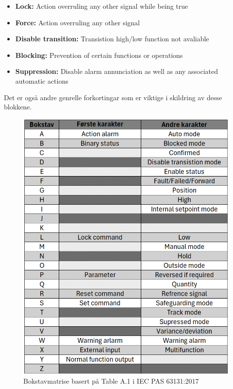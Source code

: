 \begin{itemize}
    \item \textbf{Lock:} Action overruling any other signal while being true
    \item \textbf{Force:} Action overruling any other signal                        
    \item \textbf{Disable transition:} Transistion high/low function not avaliable  
    \item \textbf{Blocking:} Prevention of certain functions or operations          
    \item \textbf{Suppression:} Disable alarm annunciation as well as any associated automatic actions
\end{itemize}
Det er også andre genrelle forkortingar som er viktige i skildring av desse blokkene.
\begin{figure}[htbp]
    \centering
    \includegraphics[scale=0.35]{Figurar/IEC bokstavmatrise.png}
    \caption{Bokstavmatrise basert på Table A.1 i \gls{IEC} \gls{PAS} 63131:2017 \citep{A1}}\label{fig:SBE tilstandsmaskin}
\end{figure}

